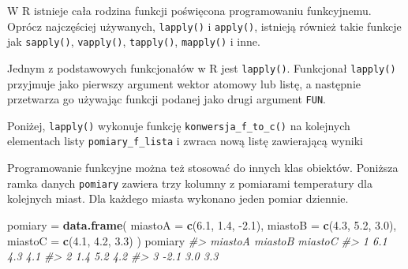 \documentclass[paper=6in:9in,pagesize=pdftex,headinclude=on,footinclude=on,10pt]{scrbook}
\newenvironment{Shaded}{\begin{snugshade}}{\end{snugshade}}
\newcommand{\CommentTok}[1]{\textcolor[rgb]{0.56,0.35,0.01}{\textit{#1}}}
\newcommand{\DataTypeTok}[1]{\textcolor[rgb]{0.13,0.29,0.53}{#1}}
\newcommand{\FloatTok}[1]{\textcolor[rgb]{0.00,0.00,0.81}{#1}}
\newcommand{\KeywordTok}[1]{\textcolor[rgb]{0.13,0.29,0.53}{\textbf{#1}}}
\newcommand{\NormalTok}[1]{#1}
\newcommand{\StringTok}[1]{\textcolor[rgb]{0.31,0.60,0.02}{#1}}
\let\BeginKnitrBlock\begin \let\EndKnitrBlock\end
\begin{document}
\BeginKnitrBlock{rmdinfo}
W R istnieje cała rodzina funkcji poświęcona programowaniu funkcyjnemu.
Oprócz najczęściej używanych, \texttt{lapply()} i \texttt{apply()}, istnieją również takie funkcje jak \texttt{sapply()}, \texttt{vapply()}, \texttt{tapply()}, \texttt{mapply()} i inne.
\EndKnitrBlock{rmdinfo}

Jednym z podstawowych funkcjonałów w R jest \texttt{lapply()}.
Funkcjonał \texttt{lapply()} przyjmuje jako pierwszy argument wektor atomowy lub listę, a następnie przetwarza go używając funkcji podanej jako drugi argument \texttt{FUN}.

Poniżej, \texttt{lapply()} wykonuje funkcję \texttt{konwersja\_f\_to\_c()} na kolejnych elementach listy \texttt{pomiary\_f\_lista} i zwraca nową listę zawierającą wyniki

\begin{Shaded}
\end{Shaded}

Programowanie funkcyjne można też stosować do innych klas obiektów.
Poniższa ramka danych \texttt{pomiary} zawiera trzy kolumny z pomiarami temperatury dla kolejnych miast.
Dla każdego miasta wykonano jeden pomiar dziennie.

\begin{Shaded}
\begin{Highlighting}[]
\NormalTok{pomiary =}\StringTok{ }\KeywordTok{data.frame}\NormalTok{(}
  \DataTypeTok{miastoA =} \KeywordTok{c}\NormalTok{(}\FloatTok{6.1}\NormalTok{, }\FloatTok{1.4}\NormalTok{, }\FloatTok{-2.1}\NormalTok{),}
  \DataTypeTok{miastoB =} \KeywordTok{c}\NormalTok{(}\FloatTok{4.3}\NormalTok{, }\FloatTok{5.2}\NormalTok{, }\FloatTok{3.0}\NormalTok{),}
  \DataTypeTok{miastoC =} \KeywordTok{c}\NormalTok{(}\FloatTok{4.1}\NormalTok{, }\FloatTok{4.2}\NormalTok{, }\FloatTok{3.3}\NormalTok{)}
\NormalTok{)}
\NormalTok{pomiary}
\CommentTok{#>   miastoA miastoB miastoC}
\CommentTok{#> 1     6.1     4.3     4.1}
\CommentTok{#> 2     1.4     5.2     4.2}
\CommentTok{#> 3    -2.1     3.0     3.3}
\end{Highlighting}
\end{Shaded}
\end{document}
